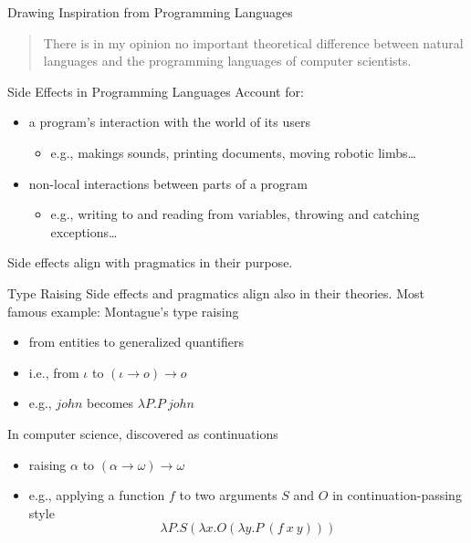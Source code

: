 \documentclass{beamer}
\begin{document}
\begin{frame}
  \begin{center}
    \vfill

    {\huge Drawing Inspiration from Programming Languages}

    \vfill

    \begin{quotation}
      There is in my opinion no important theoretical difference between
      natural languages and the programming languages of computer
      scientists.
    \end{quotation}
  \end{center}
\end{frame}


\begin{frame}{Side Effects in Programming Languages}
  \vfill
  Account for:
  \pause
  \vfill
  \begin{itemize}
  \item a program's interaction with the world of its users
    \begin{itemize}
    \item e.g., makings sounds, printing documents, moving robotic limbs\ldots
    \end{itemize}
  \end{itemize}
  \pause
  \vfill
  \begin{itemize}
  \item non-local interactions between parts of a program
    \begin{itemize}
    \item e.g., writing to and reading from variables, throwing and
      catching exceptions\ldots
    \end{itemize}
  \end{itemize}
  \vfill
  \pause
  \alert{Side effects align with pragmatics in their purpose.}
\end{frame}

\begin{frame}{Type Raising}
  Side effects and pragmatics align also in their theories.
  \pause
  \vfill
  Most famous example: Montague's type raising
  \begin{itemize}
  \item from entities to generalized quantifiers
  \item i.e., from $\iota$ to $(\iota \to o) \to o$
  \item e.g., $john$ becomes $\lambda P. P\ john$
  \end{itemize}
  \vfill
  \pause
  In computer science, discovered as continuations
  \begin{itemize}
  \item raising $\alpha$ to $(\alpha \to \omega) \to \omega$
  \item e.g., applying a function $f$ to two arguments $S$ and $O$ in
    continuation-passing style
    $$ \lambda P. S (\lambda x. O (\lambda y. P\ (f\ x\ y))) $$
  \end{itemize}
\end{frame}
\end{document}
